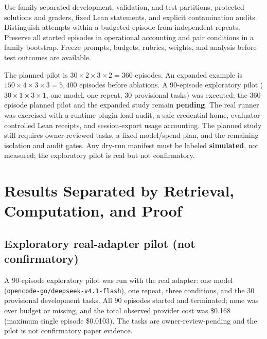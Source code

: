 \documentclass{article}
\begin{document}
Use family-separated development, validation, and test partitions, protected
solutions and graders, fixed Lean statements, and explicit contamination
audits. Distinguish attempts within a budgeted episode from independent
repeats. Preserve all started episodes in operational accounting and pair
conditions in a family bootstrap. Freeze prompts, budgets, rubrics, weights,
and analysis before test outcomes are available.

The planned pilot is $30\times2\times3\times2=360$ episodes. An expanded
example is $150\times4\times3\times3=5{,}400$ episodes before ablations.
A 90-episode exploratory pilot ($30\times1\times3\times1$, one model, one
repeat, 30 provisional tasks) was executed; the 360-episode planned pilot and
the expanded study remain \textbf{pending}. The real runner was exercised with
a runtime plugin-load audit, a safe credential home, evaluator-controlled Lean
receipts, and session-export usage accounting. The planned study still requires
owner-reviewed tasks, a fixed model/spend plan, and the remaining isolation and
audit gates. Any dry-run manifest must be labeled \textbf{simulated}, not
measured; the exploratory pilot is real but not confirmatory.

\section{Results Separated by Retrieval, Computation, and Proof}
\subsection{Exploratory real-adapter pilot (not confirmatory)}
A 90-episode exploratory pilot was run with the real adapter: one model
(\texttt{opencode-go/deepseek-v4.1-flash}), one repeat, three conditions, and
the 30 provisional development tasks. All 90 episodes started and terminated;
none was over budget or missing, and the total observed provider cost was
\$0.168 (maximum single episode \$0.0103). The tasks are owner-review-pending
and the pilot is not confirmatory paper evidence.
\end{document}
